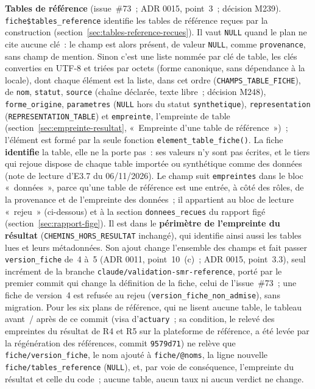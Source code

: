 \documentclass[a4paper,11pt]{article}
\newcommand{\code}[1]{\texttt{\small #1}}
\begin{document}
\medskip
\begingroup\sloppy
\noindent
\textbf{Tables de référence} (issue~\#73~; ADR 0015, point~3~; décision
M239). \code{fiche\$tables\_reference} identifie les tables de référence
reçues par la construction (section~\ref{sec:tables-reference-recues}).
Il vaut \code{NULL} quand le plan ne cite aucune clé~: le champ est alors
présent, de valeur \code{NULL}, comme \code{provenance}, sans champ de
mention. Sinon c'est une liste nommée par clé de table, les clés converties
en UTF-8 et triées par octets (forme canonique, sans dépendance à la
locale), dont chaque élément est la liste, dans cet ordre
(\code{CHAMPS\_TABLE\_FICHE}), de \code{nom}, \code{statut},
\code{source} (chaîne déclarée, texte libre~; décision M248),
\code{forme\_origine}, \code{parametres} (\code{NULL} hors du statut
\code{synthetique}), \code{representation} (\code{REPRESENTATION\_TABLE})
et \code{empreinte}, l'empreinte de table
(section~\ref{sec:empreinte-resultat}, «~Empreinte d'une table de
référence~»)~; l'élément est formé par la seule fonction
\code{element\_table\_fiche()}. La fiche \textbf{identifie} la table, elle
ne la porte pas~: ses valeurs n'y sont pas écrites, et le tiers qui rejoue
dispose de chaque table importée ou synthétique comme des données (note de
lecture d'E3.7 du 06/11/2026). Le champ suit \code{empreintes} dans le
bloc «~données~», parce qu'une table de référence est une entrée, à côté
des rôles, de la provenance et de l'empreinte des données~; il appartient au
bloc de lecture «~rejeu~» (ci-dessous) et à la section
\code{donnees\_recues} du rapport figé (section~\ref{sec:rapport-fige}). Il
est dans le \textbf{périmètre de l'empreinte du résultat}
(\code{CHEMINS\_HORS\_RESULTAT} inchangé), qui identifie ainsi aussi les
tables lues et leurs métadonnées. Son ajout change l'ensemble des champs et
fait passer \code{version\_fiche} de~4 à~5 (ADR 0011, point~10~(c)~; ADR
0015, point~3.3), seul incrément de la branche
\code{claude/validation-smr-reference}, porté par le premier commit qui
change la définition de la fiche, celui de l'issue~\#73~; une fiche de
version~4 est refusée au rejeu (\code{version\_fiche\_non\_admise}), sans
migration. Pour les six plans de référence, qui ne lisent aucune table, le
tableau avant~/ après de ce commit (visa d'\code{actuary}~; sa condition, le
relevé des empreintes du résultat de R4 et R5 sur la plateforme de
référence, a été levée par la régénération des références, commit
\code{9579d71}) ne relève que
\code{fiche/version\_fiche}, le nom ajouté à \code{fiche/@noms}, la ligne
nouvelle \code{fiche/tables\_reference} (\code{NULL}), et, par voie de
conséquence, l'empreinte du résultat et celle du code~; aucune table, aucun
taux ni aucun verdict ne change.\par
\endgroup
\end{document}
